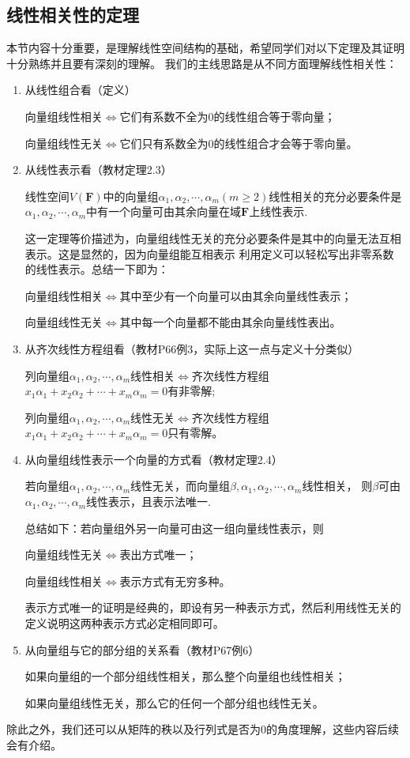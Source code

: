 \subsection{线性相关性的定理}
本节内容十分重要，是理解线性空间结构的基础，希望同学们对以下定理及其证明十分熟练并且要有深刻的理解。
我们的主线思路是从不同方面理解线性相关性：
\begin{enumerate}
	\item 从线性组合看（定义）
	
	向量组线性相关$\iff$它们有系数不全为0的线性组合等于零向量；
	
	向量组线性无关$\iff$它们只有系数全为0的线性组合才会等于零向量。
	\item 从线性表示看（教材定理2.3）
	\begin{theorem}
		线性空间$V(\mathbf{F})$中的向量组$\alpha_1,\alpha_2,\cdots,\alpha_m(m \ge 2)$线性相关的充分必要条件是
		$\alpha_1,\alpha_2,\cdots,\alpha_m$中有一个向量可由其余向量在域$\mathbf{F}$上线性表示.
	\end{theorem}
	这一定理等价描述为，向量组线性无关的充分必要条件是其中的向量无法互相表示。这是显然的，因为向量组能互相表示
	利用定义可以轻松写出非零系数的线性表示。总结一下即为：

	向量组线性相关$\iff$其中至少有一个向量可以由其余向量线性表示；
	
	向量组线性无关$\iff$其中每一个向量都不能由其余向量线性表出。
	\item 从齐次线性方程组看（教材P66例3，实际上这一点与定义十分类似）

	列向量组$\alpha_1,\alpha_2,\cdots,\alpha_m$线性相关$\iff$齐次线性方程组$x_1\alpha_1+x_2\alpha_2+\cdots+x_m\alpha_m=0$有非零解;

	列向量组$\alpha_1,\alpha_2,\cdots,\alpha_m$线性无关$\iff$齐次线性方程组$x_1\alpha_1+x_2\alpha_2+\cdots+x_m\alpha_m=0$只有零解。
	\item 从向量组线性表示一个向量的方式看（教材定理2.4）
	\begin{theorem}
		若向量组$\alpha_1,\alpha_2,\cdots,\alpha_m$线性无关，而向量组$\beta,\alpha_1,\alpha_2,\cdots,\alpha_m$线性相关，
		则$\beta$可由$\alpha_1,\alpha_2,\cdots,\alpha_m$线性表示，且表示法唯一.
	\end{theorem}
	总结如下：若向量组外另一向量可由这一组向量线性表示，则

	向量组线性无关$\iff$表出方式唯一；

	向量组线性相关$\iff$表示方式有无穷多种。

	表示方式唯一的证明是经典的，即设有另一种表示方式，然后利用线性无关的定义说明这两种表示方式必定相同即可。
	\item 从向量组与它的部分组的关系看（教材P67例6）
	
	如果向量组的一个部分组线性相关，那么整个向量组也线性相关；

	如果向量组线性无关，那么它的任何一个部分组也线性无关。
\end{enumerate}
除此之外，我们还可以从矩阵的秩以及行列式是否为0的角度理解，这些内容后续会有介绍。

